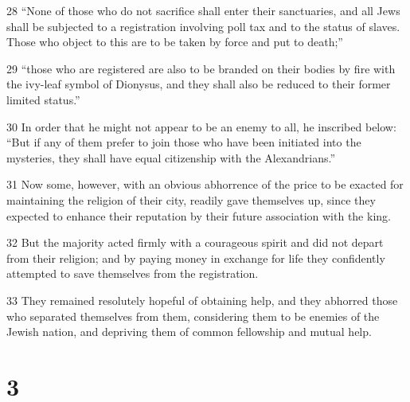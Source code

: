\par 28 “None of those who do not sacrifice shall enter their sanctuaries, and all Jews shall be subjected to a registration involving poll tax and to the status of slaves. Those who object to this are to be taken by force and put to death;”
\par 29 “those who are registered are also to be branded on their bodies by fire with the ivy-leaf symbol of Dionysus, and they shall also be reduced to their former limited status.”
\par 30 In order that he might not appear to be an enemy to all, he inscribed below: “But if any of them prefer to join those who have been initiated into the mysteries, they shall have equal citizenship with the Alexandrians.”
\par 31 Now some, however, with an obvious abhorrence of the price to be exacted for maintaining the religion of their city, readily gave themselves up, since they expected to enhance their reputation by their future association with the king.
\par 32 But the majority acted firmly with a courageous spirit and did not depart from their religion; and by paying money in exchange for life they confidently attempted to save themselves from the registration.
\par 33 They remained resolutely hopeful of obtaining help, and they abhorred those who separated themselves from them, considering them to be enemies of the Jewish nation, and depriving them of common fellowship and mutual help.

\chapter{3}


